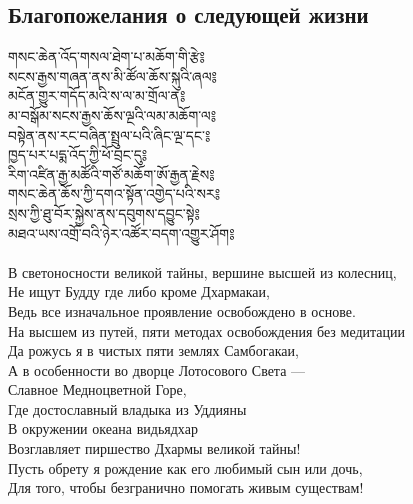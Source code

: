 \subsection{Благопожелания о следующей жизни}
\vspace{0.5cm}
\ti
གསང་ཆེན་འོད་གསལ་ཐེག་པ་མཆོག་གི་རྩེ༔\\
སངས་རྒྱས་གཞན་ནས་མི་ཚོལ་ཆོས་སྐུའི་ཞལ༔\\
མངོན་གྱུར་གདོད་མའི་ས་ལ་མ་གྲོལ་ན༔\\
མ་བསྒོམ་སངས་རྒྱས་ཆོས་ལྔའི་ལམ་མཆོག་ལ༔\\
བསྟེན་ནས་རང་བཞིན་སྤྲུལ་པའི་ཞིང་ལྔ་དང་༔\\
ཁྱད་པར་པདྨ་འོད་ཀྱི་ཕོ་བྲང་དུ༔\\
རིག་འཛིན་རྒྱ་མཚོའི་གཙོ་མཆོག་ཨོ་རྒྱན་རྗེས༔\\
གསང་ཆེན་ཆོས་ཀྱི་དགའ་སྟོན་འགྱེད་པའི་སར༔\\
སྲས་ཀྱི་ཐུ་བོར་སྐྱེས་ནས་དབུགས་དབྱུང་སྟེ༔\\
མཐའ་ཡས་འགྲོ་བའི་ཉེར་འཚོར་བདག་འགྱུར་ཤོག༔\\
\\
\ru
В светоносности великой тайны, вершине высшей из колесниц,\\
Не ищут Будду где либо кроме Дхармакаи,\\
Ведь все изначальное проявление освобождено в основе.\\
На высшем из путей, пяти методах освобождения
без медитации\\ %
Да рожусь я в чистых пяти землях Самбогакаи,\\
А в особенности во дворце Лотосового Света — \\
\indent Славное Медноцветной Горе,\\
Где достославный владыка из Уддияны\\
В окружении океана видьядхар\\
Возглавляет пиршество Дхармы великой тайны!\\
Пусть обрету я рождение как его любимый сын или дочь,\\
Для того, чтобы безгранично помогать живым существам!\\

\newpage
